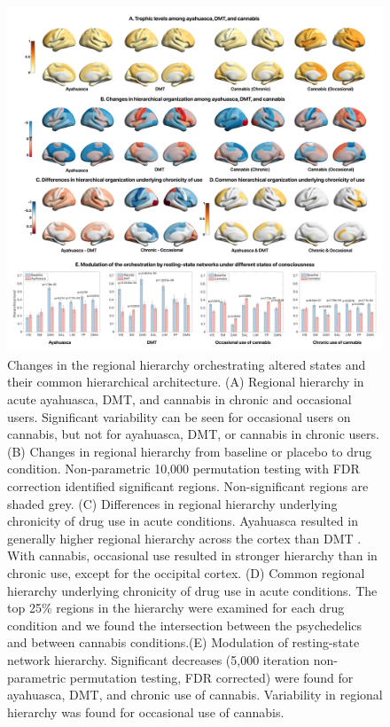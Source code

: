 \begin{figure}[h!]
    \centering
    \includegraphics[width=\textwidth]{images/Figure 4_ HL.png}
    \caption[Changes in regional hierarchy orchestrating altered states and their common architecture.]{Changes in
the regional hierarchy orchestrating altered states and their common
hierarchical architecture. (A) Regional hierarchy in acute ayahuasca, DMT,
and cannabis in chronic and occasional users. Significant variability
can be seen for occasional users on cannabis, but not for ayahuasca,
DMT, or cannabis in chronic users. (B) Changes in regional hierarchy
from baseline or placebo to drug condition. Non-parametric 10,000 permutation 
testing with FDR correction identified significant regions. Non-significant regions are shaded grey. (C) Differences in regional hierarchy underlying chronicity of drug use in acute conditions.
Ayahuasca resulted in generally higher regional hierarchy across the cortex than DMT
. With cannabis, occasional use resulted in stronger hierarchy than in chronic use,
except for the occipital cortex. (D) Common regional hierarchy underlying chronicity of drug use in acute conditions. The top 25\% regions in the hierarchy were examined for each drug condition and we found the intersection between
the psychedelics and between cannabis conditions.(E) Modulation of resting-state network hierarchy. Significant decreases (5,000 iteration non-parametric permutation testing, FDR corrected) were found for ayahuasca, DMT, and chronic use of cannabis. Variability in regional hierarchy was found for occasional use of cannabis.}
\label{fig:tcrender}
\end{figure}

